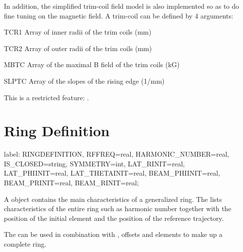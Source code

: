 In addition, the simplified trim-coil field model is also implemented so as to
do fine tuning on the magnetic field. A trim-coil can be defined by 4 arguments:
\begin{kdescription}
\item[TCR1]
   Array of inner radii of the trim coils (mm)
\item[TCR2]
   Array of outer radii of the trim coils (mm)
\item[MBTC]
    Array of the maximal B field of the trim coils (kG)
\item[SLPTC]
   Array of the slopes of the rising edge (1/mm)
\end{kdescription}
This is a restricted feature: \opalcycl.

\clearpage
\section{Ring Definition}
\label{sec:ringdefinition}

\begin{example}
label: RINGDEFINITION,
       RFFREQ=real, HARMONIC_NUMBER=real, IS_CLOSED=string, SYMMETRY=int,
       LAT_RINIT=real, LAT_PHIINIT=real, LAT_THETAINIT=real,
       BEAM_PHIINIT=real, BEAM_PRINIT=real, BEAM_RINIT=real;
\end{example}

A  object contains the main characteristics of a
generalized ring. The  lists characteristics of the
entire ring such as harmonic number together with the position of the initial
element and the position of the reference trajectory.

The  can be used in combination with ,
offsets and  elements to make up a complete ring.

